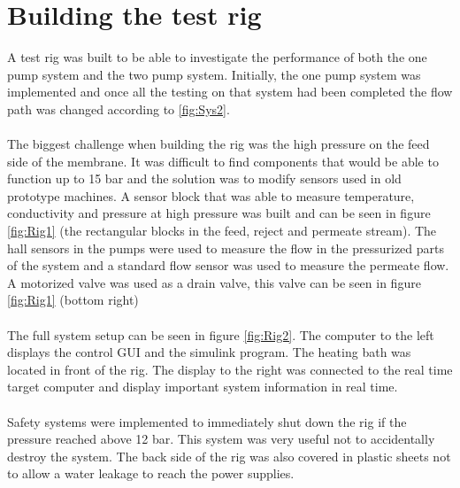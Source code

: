 \section{Building the test rig}
A test rig was built to be able to investigate the performance of both the one pump system and the two pump system. Initially, the one pump system was implemented and once all the testing on that system had been completed the flow path was changed according to \ref{fig:Sys2}.\\
\\
The biggest challenge when building the rig was the high pressure on the feed side of the membrane. It was difficult to find components that would be able to function up to 15 bar and the solution was to modify sensors used in old prototype machines. A sensor block that was able to measure temperature, conductivity and pressure at high pressure was built and can be seen in figure \ref{fig:Rig1} (the rectangular blocks in the feed, reject and permeate stream). The hall sensors in the pumps were used to measure the flow in the pressurized parts of the system and a standard flow sensor was used to measure the permeate flow. A motorized valve was used as a drain valve, this valve can be seen in figure \ref{fig:Rig1} (bottom right)\\
\\
The full system setup can be seen in figure \ref{fig:Rig2}. The computer to the left displays the control GUI and the simulink program. The heating bath was located in front of the rig. The display to the right was connected to the real time target computer and display important system information in real time.\\
\\
Safety systems were implemented to immediately shut down the rig if the pressure reached above 12 bar. This system was very useful not to accidentally destroy the system. The back side of the rig was also covered in plastic sheets not to allow a water leakage to reach the power supplies.\\
\\


